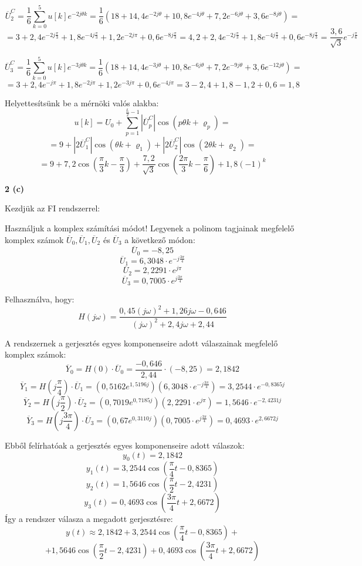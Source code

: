 \documentclass[12pt,a4paper]{article}
\begin{document}
\[\overline{U}^C_2 = \frac{1}{6}\sum_{k=0}^{5} u[k] e^{-2j\theta k} = \frac{1}{6}\left(  18+14,4e^{-2j\theta}+10,8e^{-4j\theta}+7,2e^{-6j\theta}+3,6e^{-8j\theta}\right) = \]
\[= 3+2,4e^{-2j\frac{\pi}{3}}+1,8e^{-4j\frac{\pi}{3}}+1,2e^{-2j\pi}+0,6e^{-8j\frac{\pi}{3}} = 4,2+2,4e^{-2j\frac{\pi}{3}}+1,8e^{-4j\frac{\pi}{3}}+0,6e^{-8j\frac{\pi}{3}} = \boxed{\frac{3,6}{\sqrt{3}}e^{-j\frac{\pi}{6}}}\]

\[\overline{U}^C_3 = \frac{1}{6}\sum_{k=0}^{5} u[k] e^{-3j\theta k} = \frac{1}{6}\left(  18+14,4e^{-3j\theta}+10,8e^{-6j\theta}+7,2e^{-9j\theta}+3,6e^{-12j\theta}\right) = \]
\[= 3+2,4e^{-j\pi}+1,8e^{-2j\pi}+1,2e^{-3j\pi}+0,6e^{-4j\pi} = 3-2,4+1,8-1,2+0,6 = \boxed{1,8}\]

Helyettesítsünk be a mérnöki valós alakba:
\[u[k] = U_0  + \sum_{p=1}^{\frac{L}{2}-1} |\overline{U}^C_p|\cos(p\theta k + \varrho_p) = \]
\[= 9 + |2\overline{U}^C_1|\cos(\theta k + \varrho_1)+|2\overline{U}^C_2|\cos(2\theta k + \varrho_2) = \]
\[= \boxed{9 + 7,2\cos\left(\frac{\pi}{3}k-\frac{\pi}{3}\right)+ \frac{7,2}{\sqrt{3}}\cos\left(\frac{2\pi}{3}k-\frac{\pi}{6}\right)+1,8(-1)^k}\]

\textbf{2 (c)}

Kezdjük az FI rendszerrel:

Használjuk a komplex számítási módot! Legyenek a polinom tagjainak megfelelő komplex számok $\overline{U}_0, \overline{U}_1, \overline{U}_2$ és $\overline{U}_3$ a következő módon:
\[\overline{U}_0 = -8,25\]
\[\overline{U}_1 = 6,3048\cdot e^{-j\frac{3\pi}{4}}\]
\[\overline{U}_2 = 2,2291\cdot e^{j\pi}\]
\[\overline{U}_3 = 0,7005\cdot e^{j\frac{3\pi}{4}}\]

Felhasználva, hogy:
\[H(j \omega) = \frac{0,45(j\omega)^2 +1,26j\omega-0,646}{(j\omega)^2+2,4j\omega+2,44} \]

A rendszernek a gerjesztés egyes komponenseire adott válaszainak megfelelő komplex számok:
\[\overline{Y}_0 = H(0)\cdot\overline{U}_0 = \frac{-0,646}{2,44}\cdot (-8,25) = 2,1842\]
\[\overline{Y}_1 = H\left(j\frac{\pi}{4}\right)\cdot\overline{U}_1 = (0,5162e^{1,5196j})(6,3048\cdot e^{-j\frac{3\pi}{4}}) = 3,2544\cdot e^{-0,8365j}\]
\[\overline{Y}_2 = H\left(j\frac{\pi}{2}\right)\cdot\overline{U}_2 = (0,7019e^{0,7185j})(2,2291\cdot e^{j\pi})= 1,5646\cdot e^{-2,4231j} \]
\[\overline{Y}_3 = H\left(j\frac{3\pi}{4}\right)\cdot\overline{U}_3 = (0,67e^{0,3110j})(0,7005\cdot e^{j\frac{3\pi}{4}})= 0,4693\cdot e^{2,6672j}\]

Ebből felírhatóak a gerjesztés egyes komponenseire adott válaszok:
\[y_0(t) = 2,1842\]
\[y_1(t) = 3,2544\cos\left(\frac{\pi}{4}t-0,8365\right)\]
\[y_2(t) = 1,5646\cos\left(\frac{\pi}{2}t-2,4231\right)\]
\[y_3(t) = 0,4693\cos\left(\frac{3\pi}{4}t+2,6672\right)\]
Így a rendszer válasza a megadott gerjesztésre:
\[y(t) \approx \boxed{2,1842 + 3,2544\cos\left(\frac{\pi}{4}t-0,8365\right) + }\]
\[\boxed{+ 1,5646\cos\left(\frac{\pi}{2}t-2,4231\right) + 0,4693\cos\left(\frac{3\pi}{4}t+2,6672\right)}\]
\end{document}

